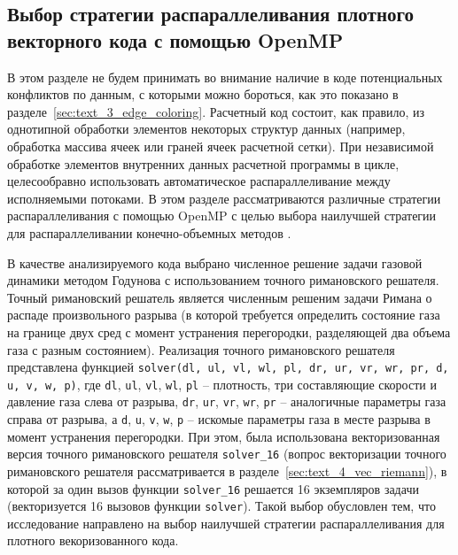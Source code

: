 \subsection{Выбор стратегии распараллеливания плотного \\ векторного кода с помощью OpenMP}\label{abbr:openmp3}

В этом разделе не будем принимать во внимание наличие в коде потенциальных конфликтов по данным, с которыми можно бороться, как это показано в разделе~\ref{sec:text_3_edge_coloring}.
Расчетный код состоит, как правило, из однотипной обработки элементов некоторых структур данных (например, обработка массива ячеек или граней ячеек расчетной сетки).
При независимой обработке элементов внутренних данных расчетной программы в цикле, целесообравно использовать автоматическое распараллеливание между исполняемыми потоками.
В этом разделе рассматриваются различные стратегии распараллеливания с помощью OpenMP \cite{OpenMP6} с целью выбора наилучшей стратегии для распараллеливании конечно-объемных методов \cite{Vorobyov2020ParVec}.

В качестве анализируемого кода выбрано численное решение задачи газовой динамики методом Годунова\label{term:godunov_method2} с использованием точного римановского решателя\label{term:riemann_solver2}.
Точный римановский решатель является численным решеним задачи Римана о распаде произвольного разрыва (в которой требуется определить состояние газа на границе двух сред с момент устранения перегородки, разделяющей два объема газа с разным состоянием).
Реализация точного римановского решателя \cite{riemannvecGithub} представлена функцией \texttt{solver(dl, ul, vl, wl, pl, dr, ur, vr, wr, pr, d, u, v, w, p)}, где \texttt{dl}, \texttt{ul}, \texttt{vl}, \texttt{wl}, \texttt{pl} -- плотность, три составляющие скорости и давление газа слева от разрыва, \texttt{dr}, \texttt{ur}, \texttt{vr}, \texttt{wr}, \texttt{pr} -- аналогичные параметры газа справа от разрыва, а \texttt{d}, \texttt{u}, \texttt{v}, \texttt{w}, \texttt{p} -- искомые параметры газа в месте разрыва в момент устранения перегородки.
При этом, была использована векторизованная версия точного римановского решателя \texttt{solver\_16} (вопрос векторизации точного римановского решателя рассматривается в разделе~\ref{sec:text_4_vec_riemann}), в которой за один вызов функции \texttt{solver\_16} решается 16 экземпляров задачи (векторизуется 16 вызовов функции \texttt{solver}).
Такой выбор обусловлен тем, что исследование направлено на выбор наилучшей стратегии распараллеливания для плотного векоризованного кода.

